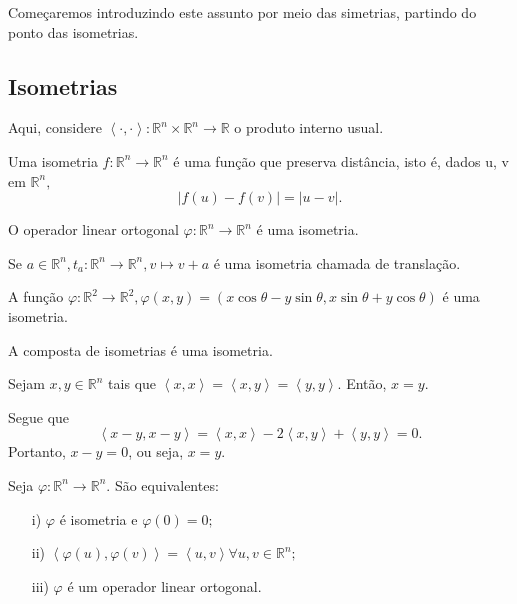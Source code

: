 \documentclass[algebra_notes.tex]{subfiles}
\begin{document}
Começaremos introduzindo este assunto por meio das simetrias, partindo do ponto das isometrias.
\subsection{Isometrias}
Aqui, considere $\left< \cdot , \cdot  \right>:\mathbb{R}^{n}\times \mathbb{R}^{n}\rightarrow \mathbb{R}$ o produto interno usual.
\begin{def*}
	Uma isometria $f:\mathbb{R}^{n}\rightarrow \mathbb{R}^{n}$ é uma função que preserva distância, isto é,
	dados u, v em $\mathbb{R}^{n},$
	$$
		|f(u)-f(v)| = |u-v|.
	$$
\end{def*}
\begin{example*}
	O operador linear ortogonal $\varphi :\mathbb{R}^{n}\rightarrow \mathbb{R}^{n}$ é uma isometria.
\end{example*}
\begin{example*}
	Se $a\in \mathbb{R}^{n}, t_{a}:\mathbb{R}^{n}\rightarrow \mathbb{R}^{n}, v\mapsto v+a$ é uma isometria chamada
	de translação.
\end{example*}
\begin{example*}
	A função $\varphi :\mathbb{R}^{2}\rightarrow \mathbb{R}^{2}, \varphi (x,y)=(x\cos{\theta }-y\sin{\theta }, x\sin{\theta }+y\cos{\theta })$
	é uma isometria.
\end{example*}
\begin{example*}
	A composta de isometrias é uma isometria.
\end{example*}
\begin{lemma*}
	Sejam $x,y\in \mathbb{R}^{n}$ tais que $\left< x, x \right> = \left< x, y \right> = \left< y, y \right>.$ Então,
	$x = y.$
\end{lemma*}
\begin{proof*}
	Segue que
	$$
		\left< x-y, x-y \right> = \left< x, x \right>-2\left< x, y \right>+\left< y, y \right> = 0.
	$$
	Portanto, $x-y =0$, ou seja, $x=y.$ \qedsymbol
\end{proof*}
\begin{theorem*}
	Seja $\varphi :\mathbb{R}^{n}\rightarrow \mathbb{R}^{n}.$ São equivalentes:
	\begin{itemize}
		\item[i)] $\varphi $ é isometria e $\varphi (0)=0;$
		\item[ii)] $\left< \varphi (u), \varphi (v) \right> = \left< u, v \right>\forall u, v\in \mathbb{R}^{n};$
		\item[iii)]$\varphi $ é um operador linear ortogonal.
	\end{itemize}
\end{theorem*}
\end{document}

